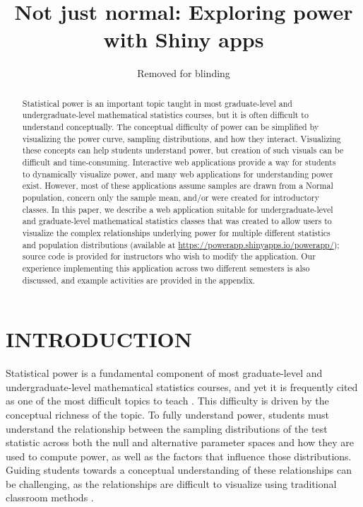 \documentclass{TISE}
\title{Not just normal: Exploring power with Shiny apps}
\author{Removed for blinding}
\begin{document}
\pagestyle{plain}
\setcounter{page}{1}

\begin{abstract}
	Statistical power is an important topic taught in most graduate-level and undergraduate-level mathematical statistics courses, but it is often difficult to understand conceptually. The conceptual difficulty of power can be simplified by visualizing the power curve, sampling distributions, and how they interact. Visualizing these concepts can help students understand power, but creation of such visuals can be difficult and time-consuming. Interactive web applications provide a way for students to dynamically visualize power, and many web applications for understanding power exist. However, most of these applications assume samples are drawn from a Normal population, concern only the sample mean, and/or were created for introductory classes. In this paper, we describe a web application suitable for undergraduate-level and graduate-level mathematical statistics classes that was created to allow users to visualize the complex relationships underlying power for multiple different statistics and population distributions (available at \url{https://powerapp.shinyapps.io/powerapp/}); source code is provided for instructors who wish to modify the application. Our experience implementing this application across two different semesters is also discussed, and example activities are provided in the appendix.  
\end{abstract}
	
\section{INTRODUCTION}

Statistical power is a fundamental component of most graduate-level and undergraduate-level mathematical statistics courses, and yet it is frequently cited as one of the most difficult topics to teach \citep{aberson2002}. This difficulty is driven by the conceptual richness of the topic. To fully understand power, students must understand the relationship between the sampling distributions of the test statistic across both the null and alternative parameter spaces and how they are used to compute power, as well as the factors that influence those distributions. Guiding students towards a conceptual understanding of these relationships can be challenging, as the relationships are difficult to visualize using traditional classroom methods \citep{aberson2002}.
\end{document}

